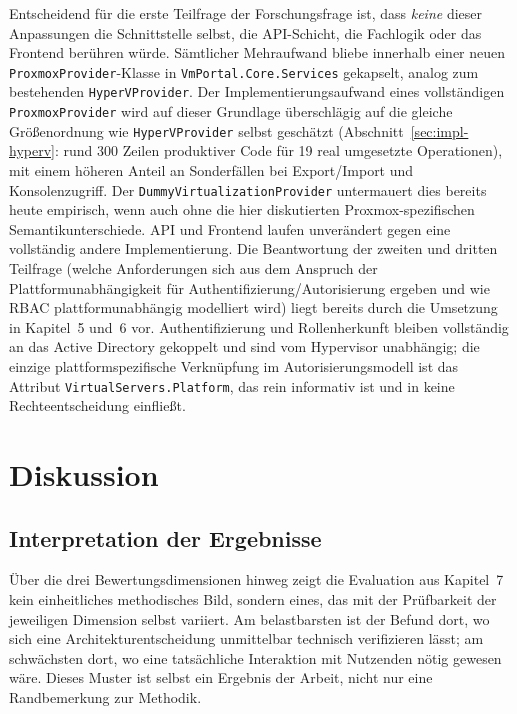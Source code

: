 \documentclass[12pt,a4paper]{article}
\begin{document}
Entscheidend für die erste Teilfrage der Forschungsfrage ist, dass \emph{keine} dieser Anpassungen die Schnittstelle selbst, die API-Schicht, die Fachlogik oder das Frontend berühren würde. Sämtlicher Mehraufwand bliebe innerhalb einer neuen \texttt{ProxmoxProvider}-Klasse in \texttt{VmPortal.Core.Services} gekapselt, analog zum bestehenden \texttt{HyperVProvider}. Der Implementierungsaufwand eines vollständigen \texttt{ProxmoxProvider} wird auf dieser Grundlage überschlägig auf die gleiche Größenordnung wie \texttt{HyperVProvider} selbst geschätzt (Abschnitt~\ref{sec:impl-hyperv}: rund 300 Zeilen produktiver Code für 19 real umgesetzte Operationen), mit einem höheren Anteil an Sonderfällen bei Export/Import und Konsolenzugriff. Der \texttt{DummyVirtualizationProvider} untermauert dies bereits heute empirisch, wenn auch ohne die hier diskutierten Proxmox-spezifischen Semantikunterschiede. API und Frontend laufen unverändert gegen eine vollständig andere Implementierung. Die Beantwortung der zweiten und dritten Teilfrage (welche Anforderungen sich aus dem Anspruch der Plattformunabhängigkeit für Authentifizierung/Autorisierung ergeben und wie RBAC plattformunabhängig modelliert wird) liegt bereits durch die Umsetzung in Kapitel~5 und~6 vor. Authentifizierung und Rollenherkunft bleiben vollständig an das Active Directory gekoppelt und sind vom Hypervisor unabhängig; die einzige plattformspezifische Verknüpfung im Autorisierungsmodell ist das Attribut \texttt{VirtualServers.Platform}, das rein informativ ist und in keine Rechteentscheidung einfließt.

\newpage
\section{Diskussion}

\subsection{Interpretation der Ergebnisse}

Über die drei Bewertungsdimensionen hinweg zeigt die Evaluation aus Kapitel~7 kein einheitliches methodisches Bild, sondern eines, das mit der Prüfbarkeit der jeweiligen Dimension selbst variiert. Am belastbarsten ist der Befund dort, wo sich eine Architekturentscheidung unmittelbar technisch verifizieren lässt; am schwächsten dort, wo eine tatsächliche Interaktion mit Nutzenden nötig gewesen wäre. Dieses Muster ist selbst ein Ergebnis der Arbeit, nicht nur eine Randbemerkung zur Methodik.
\end{document}
